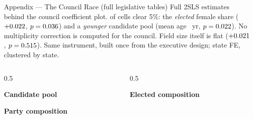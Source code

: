 
\begin{frame}{Appendix --- The Council Race (full legislative tables)}
\hypertarget{app:legislative}{}
\footnotesize
Full 2SLS estimates behind the council coefficient plot. \CouncilNSig{} of \CouncilNOutcomes{} cells clear 5\%: the \emph{elected} female share ($+0.022$, $p=0.036$) and a \emph{younger} candidate pool (mean age \CouncilAgeYr~yr, $p=0.022$). No multiplicity correction is computed for the council. Field size itself is flat ($+0.021$, $p=0.515$). Same instrument, built once from the executive design; state FE, clustered by state.
\smallskip

\begin{columns}[T]
\begin{column}{0.5\textwidth}
{\centering\scriptsize\textbf{Candidate pool}\par}
\begin{center}\scriptsize
\resizebox{\linewidth}{!}{}
\end{center}
\smallskip

{\centering\scriptsize\textbf{Party composition}\par}
\begin{center}\scriptsize
\resizebox{0.85\linewidth}{!}{}
\end{center}
\end{column}
\begin{column}{0.5\textwidth}
{\centering\scriptsize\textbf{Elected composition}\par}
\begin{center}\scriptsize
\resizebox{\linewidth}{!}{}
\end{center}
\end{column}
\end{columns}
\smallskip
\footnotesize \hfill\hyperlink{app:councilplacebo}{}
\end{frame}
